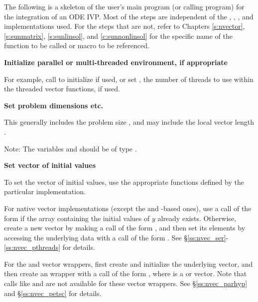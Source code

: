 The following is a skeleton of the user's main program (or calling
program) for the integration of an ODE IVP. Most of the steps are
independent of the {\nvector}, {\sunmatrix}, {\sunlinsol}, and {\sunnonlinsol}
implementations used. For the steps that are not, refer to Chapters
\ref{s:nvector}, \ref{s:sunmatrix}, \ref{s:sunlinsol}, and \ref{c:sunnonlinsol}
for the specific name of the function to be called or macro to be referenced.

\begin{Steps}

\item
  {\bf Initialize parallel or multi-threaded environment, if appropriate}

  For example, call  to initialize {\mpi} if used, or
  set , the number of threads to use within the threaded
  vector functions, if used.

\item
  {\bf Set problem dimensions etc.}

  This generally includes the problem size , and may include
  the local vector length .

  Note: The variables  and  should be of type .

\item
  {\bf Set vector of initial values}

  To set the vector  of initial values, use the appropriate
  functions defined by the particular {\nvector} implementation.

  For native {\sundials} vector implementations
  (except the {\cuda} and {\raja}-based ones), use a call
  of the form  if the  array
   containing the initial values of $y$ already exists.
  Otherwise, create a new vector by making a call of the form
  , and then set its elements by accessing
  the underlying data with a call of the form
  .
  See \S\ref{ss:nvec_ser}-\ref{ss:nvec_pthreads} for details.

  For the {\hypre} and {\petsc} vector wrappers, first create and initialize
  the underlying vector, and then create an {\nvector} wrapper with a call
  of the form , where  is a {\hypre}
  or {\petsc} vector. Note that calls like  and
   are not available for these vector wrappers.
  See \S\ref{ss:nvec_parhyp} and \S\ref{ss:nvec_petsc} for details.


\end{Steps}
